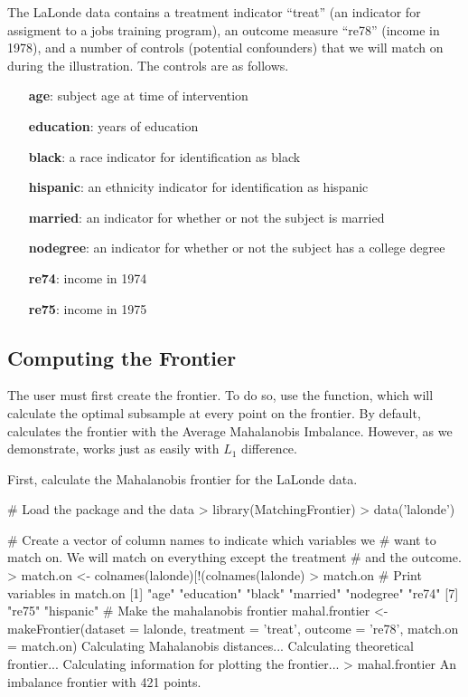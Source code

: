 \documentclass[nojss]{jss}
\begin{document}
The LaLonde data contains a treatment indicator ``treat'' (an
indicator for assigment to a jobs training program), an outcome
measure ``re78'' (income in 1978), and a number of controls (potential
confounders) that we will match on during the illustration. The
controls are as follows.

\begin{itemize}
  \item[\textbf{age}:] subject age at time of intervention
  \item[\textbf{education}:] years of education
  \item[\textbf{black}:] a race indicator for identification as black
  \item[\textbf{hispanic}:] an ethnicity indicator for identification as hispanic
  \item[\textbf{married}:] an indicator for whether or not the subject is married
  \item[\textbf{nodegree}:] an indicator for whether or not the subject has a college degree
  \item[\textbf{re74}:] income in 1974
  \item[\textbf{re75}:] income in 1975
\end{itemize}

\subsection{Computing the Frontier}

The user must first create the frontier. To do so, use the
 function, which will calculate the optimal
subsample at every point on the frontier. By default,
 calculates the frontier with the Average
Mahalanobis Imbalance. However, as we demonstrate,
 works just as easily with $L_1$ difference.

First, calculate the Mahalanobis frontier for the LaLonde
data.

\begin{CodeChunk}
\begin{CodeInput}
# Load the package and the data
> library(MatchingFrontier)
> data('lalonde')

# Create a vector of column names to indicate which variables we 
# want to match on. We will match on everything except the treatment
# and the outcome.
> match.on <- colnames(lalonde)[!(colnames(lalonde) %
> match.on # Print variables in match.on
[1] "age"       "education" "black"     "married"   "nodegree"  "re74"     
[7] "re75"      "hispanic" 
# Make the mahalanobis frontier
mahal.frontier <- makeFrontier(dataset = lalonde, 
                            treatment = 'treat', 
                            outcome = 're78', 
                            match.on = match.on)
Calculating Mahalanobis distances...
Calculating theoretical frontier...
Calculating information for plotting the frontier...
> mahal.frontier
An imbalance frontier with 421 points.
\end{CodeInput}
\end{CodeChunk}
\end{document}
